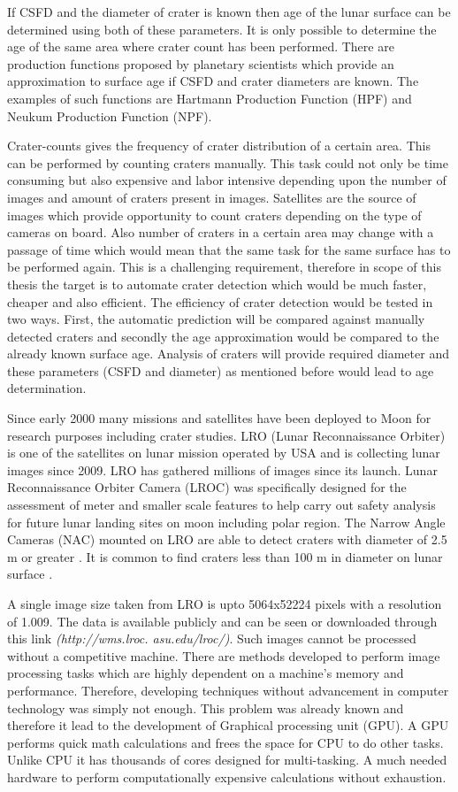 \documentclass[11pt]{article}
\begin{document}
If CSFD and the diameter of crater is known then age of the lunar surface can be determined using both of these parameters. It is only possible to determine the age of the same area where crater count has been performed. There are production functions proposed by planetary scientists which provide an approximation to surface age if CSFD and crater diameters are known. The examples of such functions are Hartmann Production Function (HPF) and Neukum Production Function (NPF).

Crater-counts gives the frequency of crater distribution of a certain area. This can be performed by counting craters manually. This task could not only be time consuming but also expensive and labor intensive depending upon the number of images and amount of craters present in images. Satellites are the source of images which provide opportunity to count craters depending on the type of cameras on board. Also number of craters in a certain area may change with a passage of time which would mean that the same task for the same surface has to be performed again. This is a challenging requirement, therefore in scope of this thesis the target is to automate crater detection which would be much faster, cheaper and also efficient. The efficiency of crater detection would be tested in two ways. First, the automatic prediction will be compared against manually detected craters and secondly the age approximation would be compared to the already known surface age. Analysis of craters will provide required diameter and these parameters (CSFD and diameter) as mentioned before would lead to age determination.

Since early 2000 many missions and satellites have been deployed to Moon for research purposes including crater studies. LRO (Lunar Reconnaissance Orbiter) is one of the satellites on lunar mission operated by USA and is collecting lunar images since 2009. LRO has gathered millions of images since its launch. Lunar Reconnaissance Orbiter Camera (LROC) was specifically designed for the assessment of meter and smaller scale features to help carry out safety analysis for future lunar landing sites on moon including polar region. The Narrow Angle Cameras (NAC) mounted on LRO are able to detect craters with diameter of 2.5 m or greater \cite{robinson2010lunar}. It is common to find craters less than 100 m in diameter on lunar surface \cite{robinson2010lunar}.

A single image size taken from LRO is upto 5064x52224 pixels with a resolution of 1.009. The data is available publicly and can be seen or downloaded through this link \textit{(http://wms.lroc.
	asu.edu/lroc/)}. 
Such images cannot be processed without a competitive machine. There are methods developed to perform image processing tasks which are highly dependent on a machine's memory and performance. Therefore, developing techniques without advancement in computer technology was simply not enough. This problem was already known and therefore it lead to the development of Graphical processing unit (GPU). A GPU performs quick math calculations and frees the space for CPU to do other tasks. Unlike CPU it has thousands of cores designed for multi-tasking. A much needed hardware to perform computationally expensive calculations without exhaustion. 
\end{document}
